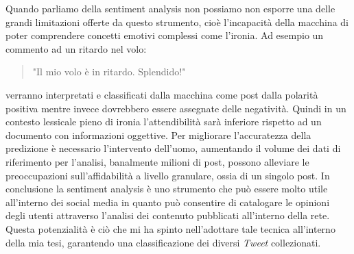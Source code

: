 Quando parliamo della sentiment analysis non possiamo non esporre una delle grandi limitazioni offerte da questo strumento, cioè l'incapacità della macchina di poter comprendere concetti emotivi complessi come l'ironia.
Ad esempio un commento ad un ritardo nel volo:
\begin{quote}
"Il mio volo è in ritardo. Splendido!"
\end{quote}
verranno interpretati e classificati dalla macchina come post dalla polarità positiva mentre invece dovrebbero essere assegnate delle negatività. Quindi in un contesto lessicale pieno di ironia l'attendibilità sarà inferiore rispetto ad un documento con informazioni oggettive.
Per migliorare l'accuratezza della predizione è necessario l'intervento dell'uomo, aumentando il volume dei dati di riferimento per l'analisi, banalmente milioni di post, possono alleviare le preoccupazioni sull'affidabilità a livello granulare, ossia di un singolo post.
In conclusione la sentiment analysis è uno strumento che può essere molto utile all'interno dei social media in quanto può consentire di catalogare le opinioni degli utenti attraverso l'analisi dei contenuto pubblicati all'interno della rete. Questa potenzialità è ciò che mi ha spinto nell'adottare tale tecnica all'interno della mia tesi, garantendo una  classificazione dei diversi \textit{Tweet} collezionati.


\begin{comment}
La sentiment analysis può essere sviluppata seguendo 4 approcci differenti:
\begin{itemize}
\item \textit{Spotting di parole chiave}: il testo viene classificato da categorie influenti basate sulla presenza di parole influenti come contento, triste, impaurito, annoiato.
\item \textit{Affinità lessicale}: oltre a rilevare le parole influenzanti, assegna arbitrariamente alle parole una probabile affinità a emozioni particolari. 
\item \textit{Metodi statistici}:  questo approccio si basa sugli elementi trattati dal machine learning come analisi semantica latente, macchine a vettori di supporto, bag of words. Partendo da questi elementi per estrarre le opinioni in un contesto e ottenerne delle caratteristiche, vengono utilizzate delle relazioni grammaticali tra le parole. Le relazioni sono ottenute da un'analisi sintattica e profonda del testo.
\item \textit{Tecniche di livello concettuale}: utilizza gli elementi della rappresentazione della conoscenza come le \textit{ontologie} e le \textit{reti semantiche}, riuscendo a rilevare semantiche che sono espresse in maniera sottile all'interno del testo.
\end{itemize}
In conclusione la sentiment analysis è uno strumento che può essere molto utile all'interno dei social media in quanto può consentire di catalogare le opinioni degli utenti attraverso l'analisi dei contenuto pubblicati all'interno della rete. Questa potenzialità è ciò che mi ha spinto nell'adottare tale tecnica all'interno della mia tesi.
\end{comment}


